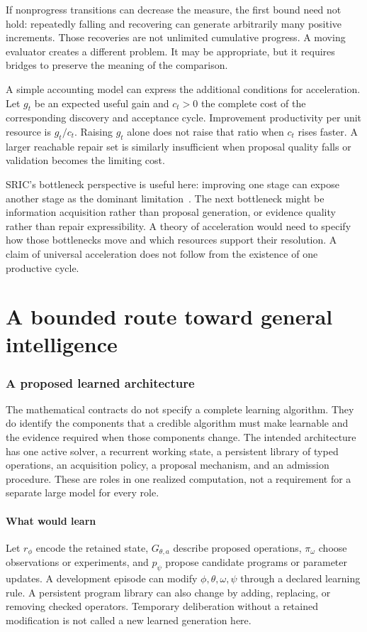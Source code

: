 \documentclass[11pt,letterpaper]{article}
\theoremstyle{plain}
\theoremstyle{definition}
\begin{document}
If nonprogress transitions can decrease the measure, the first bound need not hold: repeatedly falling and recovering can generate arbitrarily many positive increments. Those recoveries are not unlimited cumulative progress. A moving evaluator creates a different problem. It may be appropriate, but it requires bridges to preserve the meaning of the comparison.

A simple accounting model can express the additional conditions for acceleration. Let $g_t$ be an expected useful gain and $c_t>0$ the complete cost of the corresponding discovery and acceptance cycle. Improvement productivity per unit resource is $g_t/c_t$. Raising $g_t$ alone does not raise that ratio when $c_t$ rises faster. A larger reachable repair set is similarly insufficient when proposal quality falls or validation becomes the limiting cost.

SRIC's bottleneck perspective is useful here: improving one stage can expose another stage as the dominant limitation~\cite{sric}. The next bottleneck might be information acquisition rather than proposal generation, or evidence quality rather than repair expressibility. A theory of acceleration would need to specify how those bottlenecks move and which resources support their resolution. A claim of universal acceleration does not follow from the existence of one productive cycle.


\clearpage\part{A bounded route toward general intelligence}\label{part:architecture}
\section{A proposed learned architecture}\label{sec:architecture}
The mathematical contracts do not specify a complete learning algorithm. They do identify the components that a credible algorithm must make learnable and the evidence required when those components change. The intended architecture has one active solver, a recurrent working state, a persistent library of typed operations, an acquisition policy, a proposal mechanism, and an admission procedure. These are roles in one realized computation, not a requirement for a separate large model for every role.

\subsection{What would learn}
Let $r_\phi$ encode the retained state, $G_{\theta,a}$ describe proposed operations, $\pi_\omega$ choose observations or experiments, and $p_\psi$ propose candidate programs or parameter updates. A development episode can modify $\phi,\theta,\omega,\psi$ through a declared learning rule. A persistent program library can also change by adding, replacing, or removing checked operators. Temporary deliberation without a retained modification is not called a new learned generation here.
\end{document}
